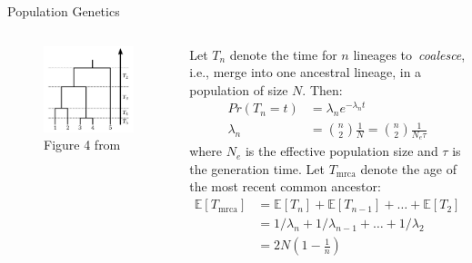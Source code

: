 \begin{frame}{Population Genetics}
\begin{columns}
 \column{2.5in}
\begin{figure}[!h]
\begin{center}
\includegraphics[scale=.45]{FIGURES/coaltimes.jpg}
\caption{Figure 4 from~\cite{volz2013}}
\end{center}
\end{figure}
 \column{2.5in}
 Let $T_n$ denote the time for $n$ lineages to~\textit{coalesce}, i.e., merge into one ancestral lineage, in a population of size $N$.
 Then:
\begin{align*}
Pr(T_n = t) &= \lambda_n e^{-\lambda_nt}\\
\lambda_n &= \binom{n}{2}\frac{1}{N} = \binom{n}{2}\frac{1}{N_e\tau}
\end{align*}
where $N_e$ is the effective population size and $\tau$ is the generation time.
Let $T_{\text{mrca}}$ denote the age of the most recent common ancestor:
\begin{align*}
 \mathbb{E}[T_{\text{mrca}}] &= \mathbb{E}[T_n] + \mathbb{E}[T_{n-1}] + \ldots + \mathbb{E}[T_2]\\
 &= 1/\lambda_n + 1/\lambda_{n-1} + \ldots + 1/\lambda_2\\
 &= 2N(1-\frac{1}{n})
\end{align*}

\end{columns}
\end{frame}
